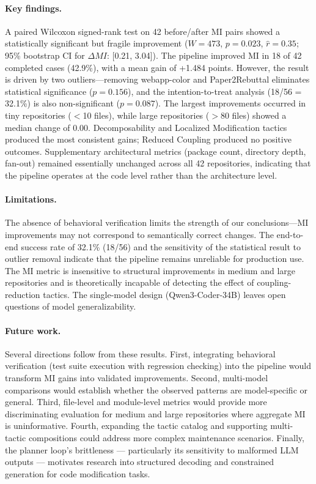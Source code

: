\documentclass[sigconf,review,anonymous]{acmart}
\begin{document}
\paragraph{Key findings.}
A paired Wilcoxon signed-rank test on 42 before/after MI pairs showed a statistically significant but fragile improvement ($W = 473$, $p = 0.023$, $\hat{r} = 0.35$; 95\% bootstrap CI for $\Delta MI$: [0.21, 3.04]). The pipeline improved MI in 18 of 42 completed cases (42.9\%), with a mean gain of +1.484 points. However, the result is driven by two outliers---removing webapp-color and Paper2Rebuttal eliminates statistical significance ($p = 0.156$), and the intention-to-treat analysis (18/56 = 32.1\%) is also non-significant ($p = 0.087$). The largest improvements occurred in tiny repositories ($<$10 files), while large repositories ($>$80 files) showed a median change of 0.00. Decomposability and Localized Modification tactics produced the most consistent gains; Reduced Coupling produced no positive outcomes. Supplementary architectural metrics (package count, directory depth, fan-out) remained essentially unchanged across all 42 repositories, indicating that the pipeline operates at the code level rather than the architecture level.

\paragraph{Limitations.}
The absence of behavioral verification limits the strength of our conclusions---MI improvements may not correspond to semantically correct changes. The end-to-end success rate of 32.1\% (18/56) and the sensitivity of the statistical result to outlier removal indicate that the pipeline remains unreliable for production use. The MI metric is insensitive to structural improvements in medium and large repositories and is theoretically incapable of detecting the effect of coupling-reduction tactics. The single-model design (Qwen3-Coder-34B) leaves open questions of model generalizability.

\paragraph{Future work.}
Several directions follow from these results. First, integrating behavioral verification (test suite execution with regression checking) into the pipeline would transform MI gains into validated improvements. Second, multi-model comparisons would establish whether the observed patterns are model-specific or general. Third, file-level and module-level metrics would provide more discriminating evaluation for medium and large repositories where aggregate MI is uninformative. Fourth, expanding the tactic catalog and supporting multi-tactic compositions could address more complex maintenance scenarios. Finally, the planner loop's brittleness — particularly its sensitivity to malformed LLM outputs — motivates research into structured decoding and constrained generation for code modification tasks.
\end{document}
